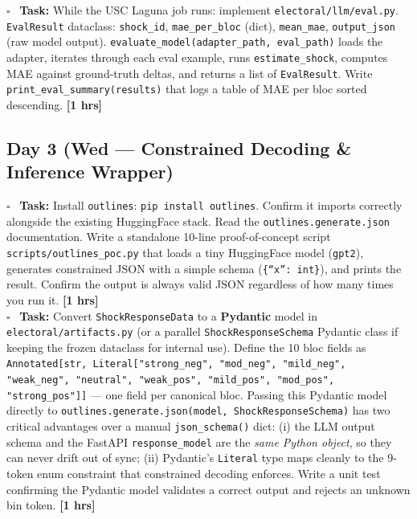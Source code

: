\documentclass[11pt]{article}
\newcommand{\hrs}[1]{\textbf{[#1 hrs]}}
\newcommand{\dayhead}[2]{%
  \subsection*{Day #1 \normalfont\small\color{codegray}(#2)}}
\newcommand{\task}[2]{%
  \noindent\textbf{Task:} #1 \hfill \hrs{#2}\\}
\newcommand{\done}{\textcolor{sectionblue}{$\square$}\ }
\begin{document}
\begin{taskbox}
\done \task{While the USC Laguna job runs: implement \texttt{electoral/llm/eval.py}.
  \texttt{EvalResult} dataclass: \texttt{shock\_id}, \texttt{mae\_per\_bloc}
  (dict), \texttt{mean\_mae}, \texttt{output\_json} (raw model output).
  \texttt{evaluate\_model(adapter\_path, eval\_path)} loads the adapter,
  iterates through each eval example, runs \texttt{estimate\_shock}, computes
  MAE against ground-truth deltas, and returns a list of \texttt{EvalResult}.
  Write \texttt{print\_eval\_summary(results)} that logs a table of MAE per
  bloc sorted descending.}{1}
\end{taskbox}

\dayhead{3}{Wed --- Constrained Decoding \& Inference Wrapper}

\begin{taskbox}
\done \task{Install \texttt{outlines}: \texttt{pip install outlines}. Confirm
  it imports correctly alongside the existing HuggingFace stack. Read the
  \texttt{outlines.generate.json} documentation. Write a standalone
  10-line proof-of-concept script \texttt{scripts/outlines\_poc.py} that
  loads a tiny HuggingFace model (\texttt{gpt2}), generates constrained JSON
  with a simple schema (\texttt{\{``x'': int\}}), and prints the result.
  Confirm the output is always valid JSON regardless of how many times
  you run it.}{1}

\done \task{Convert \texttt{ShockResponseData} to a \textbf{Pydantic} model
  in \texttt{electoral/artifacts.py} (or a parallel
  \texttt{ShockResponseSchema} Pydantic class if keeping the frozen
  dataclass for internal use). Define the 10 bloc fields as
  \texttt{Annotated[str, Literal["strong\_neg", "mod\_neg", "mild\_neg",
  "weak\_neg", "neutral", "weak\_pos", "mild\_pos", "mod\_pos",
  "strong\_pos"]]} --- one field per canonical bloc. Passing this Pydantic
  model directly to \texttt{outlines.generate.json(model,
  ShockResponseSchema)} has two critical advantages over a manual
  \texttt{json\_schema()} dict: (i) the LLM output schema and the
  FastAPI \texttt{response\_model} are the \emph{same Python object},
  so they can never drift out of sync; (ii) Pydantic's \texttt{Literal}
  type maps cleanly to the 9-token enum constraint that constrained
  decoding enforces. Write a unit test confirming the Pydantic model
  validates a correct output and rejects an unknown bin token.}{1}


\end{taskbox}
\end{document}
